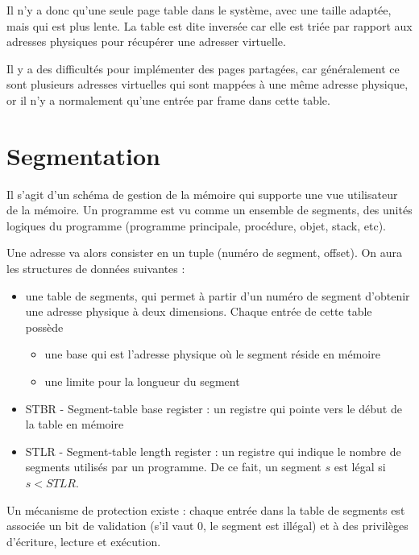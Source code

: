 	Il n'y a donc qu'une seule page table dans le système, avec une taille adaptée, mais qui est plus lente. La table est dite inversée car elle est triée par rapport aux adresses physiques pour récupérer une adresser virtuelle.
	
	
	Il y a des difficultés pour implémenter des pages partagées, car généralement ce sont plusieurs adresses virtuelles qui sont mappées à une même adresse physique, or il n'y a normalement qu'une entrée par frame dans cette table.
	
\section{Segmentation}

Il s'agit d'un schéma de gestion de la mémoire qui supporte une vue utilisateur de la mémoire. Un programme est vu comme un ensemble de segments, des unités logiques du programme (programme principale, procédure, objet, stack, etc).


Une adresse va alors consister en un tuple (numéro de segment, offset). On aura les structures de données suivantes :

\begin{itemize}
	\item une table de segments, qui permet à partir d'un numéro de segment d'obtenir une adresse physique à deux dimensions. Chaque entrée de cette table possède
	
	\begin{itemize}
		\item une base qui est l'adresse physique où le segment réside en mémoire
		\item une limite pour la longueur du segment
	\end{itemize}
	
	\item STBR - Segment-table base register : un registre qui pointe vers le début de la table en mémoire
	\item STLR - Segment-table length register : un registre qui indique le nombre de segments utilisés par un programme. De ce fait, un segment $s$ est légal si $s < STLR$.
\end{itemize}

Un mécanisme de protection existe : chaque entrée dans la table de segments est associée un bit de validation (s'il vaut 0, le segment est illégal) et à des privilèges d'écriture, lecture et exécution.

